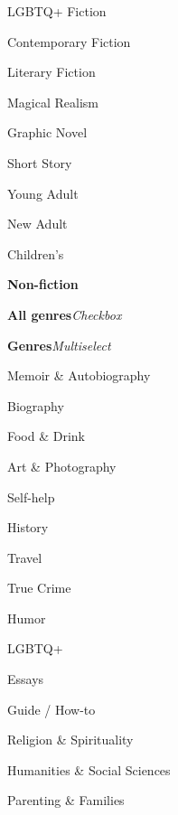 \begin{CompactItemize}[leftmargin = *]
\begin{CompactItemize}
\begin{CompactItemize}
\begin{CompactItemize}
\begin{CompactItemize}
\begin{CompactItemize}
                        \item LGBTQ+ Fiction
                        \item Contemporary Fiction
                        \item Literary Fiction
                        \item Magical Realism
                        \item Graphic Novel
                        \item Short Story
                        \item Young Adult
                        \item New Adult
                        \item Children's
                    \end{CompactItemize}
                \end{CompactItemize}
                \item \textbf{Non-fiction}
                \begin{CompactItemize}
                    \item \textbf{All genres}\quad\textit{Checkbox}
                    \item\label{cco:nonfiction_genres} \textbf{Genres}\quad\textit{Multiselect}
                    \begin{CompactItemize}
                        \item Memoir \& Autobiography
                        \item Biography
                        \item Food \& Drink
                        \item Art \& Photography
                        \item Self-help
                        \item History
                        \item Travel
                        \item True Crime
                        \item Humor
                        \item LGBTQ+
                        \item Essays
                        \item Guide / How-to
                        \item Religion \& Spirituality
                        \item Humanities \& Social Sciences
                        \item Parenting \& Families

\end{CompactItemize}
\end{CompactItemize}
\end{CompactItemize}
\end{CompactItemize}
\end{CompactItemize}
\end{CompactItemize}
